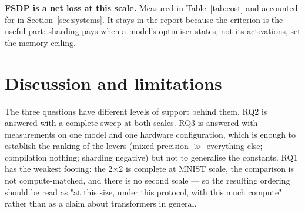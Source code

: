 \documentclass{article}
\begin{document}
\textbf{FSDP is a net loss at this scale.} Measured in Table~\ref{tab:cost} and accounted for
in Section~\ref{sec:systems}. It stays in the report because the criterion is the useful part:
sharding pays when a model's optimiser states, not its activations, set the memory ceiling.

\section{Discussion and limitations}
\label{sec:limitations}

The three questions have different levels of support behind them. RQ2 is answered with a
complete sweep at both scales. RQ3 is answered with measurements on one model and one
hardware configuration, which is enough to establish the ranking of the levers (mixed
precision $\gg$ everything else; compilation nothing; sharding negative) but not to
generalise the constants. RQ1 has the weakest footing: the 2$\times$2 is complete at MNIST
scale, the comparison is not compute-matched, and there is no second scale --- so the
resulting ordering should be read as "at this size, under this protocol, with this much
compute" rather than as a claim about transformers in general.
\end{document}
